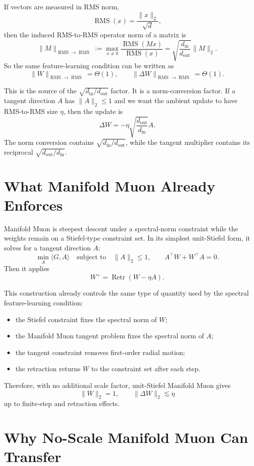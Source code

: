 \documentclass[12pt]{article}
\newcommand{\rms}{\operatorname{RMS}}
\newcommand{\Retr}{\operatorname{Retr}}
\newcommand{\fanin}{d_{\mathrm{in}}}
\newcommand{\fanout}{d_{\mathrm{out}}}
\begin{document}
If vectors are measured in RMS norm,
\[
    \rms(x) = \frac{\|x\|_2}{\sqrt{d}},
\]
then the induced RMS-to-RMS operator norm of a matrix is
\[
    \|M\|_{\rms \to \rms}
    :=
    \max_{x \ne 0}
    \frac{\rms(Mx)}{\rms(x)}
    =
    \sqrt{\frac{\fanin}{\fanout}}\|M\|_2.
\]
So the same feature-learning condition can be written as
\[
    \|W\|_{\rms \to \rms} = \Theta(1),
    \qquad
    \|\Delta W\|_{\rms \to \rms} = \Theta(1).
\]

This is the source of the $\sqrt{\fanin/\fanout}$ factor. It is a
norm-conversion factor. If a tangent direction $A$ has $\|A\|_2 \le 1$ and we
want the ambient update to have RMS-to-RMS size $\eta$, then the update is
\[
    \Delta W
    =
    -\eta
    \sqrt{\frac{\fanout}{\fanin}}
    A.
\]
The norm conversion contains $\sqrt{\fanin/\fanout}$, while the tangent
multiplier contains its reciprocal $\sqrt{\fanout/\fanin}$.

\section{What Manifold Muon Already Enforces}

Manifold Muon is steepest descent under a spectral-norm constraint while the
weights remain on a Stiefel-type constraint set. In its simplest unit-Stiefel
form, it solves for a tangent direction $A$:
\[
    \min_A \langle G, A \rangle
    \quad
    \text{subject to}
    \quad
    \|A\|_2 \le 1,
    \qquad
    A^\top W + W^\top A = 0.
\]
Then it applies
\[
    W^+ = \Retr(W - \eta A).
\]

This construction already controls the same type of quantity used by the
spectral feature-learning condition:
\begin{itemize}
    \item the Stiefel constraint fixes the spectral norm of $W$;
    \item the Manifold Muon tangent problem fixes the spectral norm of $A$;
    \item the tangent constraint removes first-order radial motion;
    \item the retraction returns $W$ to the constraint set after each step.
\end{itemize}

Therefore, with no additional scale factor, unit-Stiefel Manifold Muon gives
\[
    \|W\|_2 = 1,
    \qquad
    \|\Delta W\|_2 \lesssim \eta
\]
up to finite-step and retraction effects.

\section{Why No-Scale Manifold Muon Can Transfer}
\end{document}
